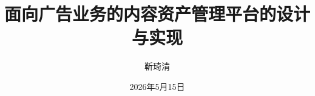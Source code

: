 \documentclass[macfonts,master,twoside,AutoFakeBold= {2}]{njuthesis}
\title{面向广告业务的内容资产管理平台的设计与实现}
\title{} %
\author{靳琦清}
\institute{南京大学}
\date{2026年5月15日}
\begin{document}

\maketitle
\makeenglishtitle


\frontmatter





%


\tableofcontents

\listoffigures

\listoftables

\mainmatter











\end{document}
